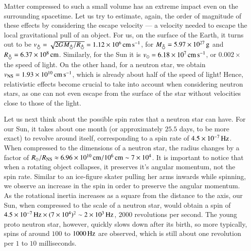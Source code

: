 Matter compressed to such a small volume has an extreme impact even on the surrounding spacetime.
Let us try to estimate, again, the order of magnitude of these effects by considering the escape velocity --- a velocity needed to escape the local gravitational pull of an object.
For us, on the surface of the Earth, it turns out to be $v_{\mathrm{\earth}} = \sqrt{2G M_{\earth} / R_{\earth}} = \Ten{1.12}{6} \cms$, for $M_{\earth} = \Ten{5.97}{27} \g$ and $R_{\earth} = \Ten{6.37}{8} \cm$.
Similarly, for the Sun it is $v_{\odot} = 6.18 \times 10^{7} \, \mathrm{cm}\,\mathrm{s}^{-1}$, or $0.002 \times$ the speed of light.
On the other hand, for a neutron star, we obtain $v_{\mathrm{NS}} = 1.93 \times 10^{10} \, \mathrm{cm}\,\mathrm{s}^{-1}$, which is already about half of the speed of light!
Hence, relativistic effects become crucial to take into account when considering neutron stars, as one can not even escape from the surface of the star without velocities close to those of the light.


Let us next think about the possible spin rates that a neutron star can have.
For our Sun, it takes about one month (or approximately $25.5$ days, to be more exact) to revolve around itself, corresponding to a spin rate of $4.5 \times 10^{-7}\, \mathrm{Hz}$.
When compressed to the dimensions of a neutron star, the radius changes by a factor of $R_{\odot} / R_{\mathrm{NS}} \approx 6.96 \times 10^{10}\, \mathrm{cm} / 10^6 \, \mathrm{cm} \sim 7 \times 10^{4}$.
It is important to notice that when a rotating object collapses, it preserves it's angular momentum, not the spin rate.
Similar to an ice-figure skater pulling her arms inwards while spinning, we observe an increase in the spin in order to preserve the angular momentum.
As the rotational inertia increases as a square from the distance to the axis, our Sun, when compressed to the scale of a neutron star, would obtain a spin of $4.5 \times 10^{-7}\, \mathrm{Hz} \times (7 \times 10^{4})^2 \sim 2 \times 10^{3} \, \mathrm{Hz}$, $2000$ revolutions per second.
The young proto neutron star, however, quickly slows down after its birth, so more typically, spins of around $100$ to $1000 \, \mathrm{Hz}$ are observed, which is still about one revolution per $1$ to $10$ milliseconds.


